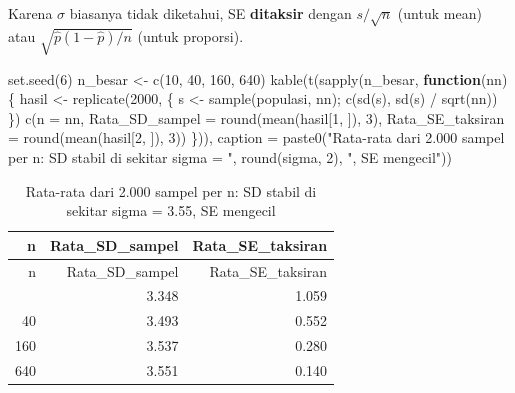 \documentclass[
  indonesian,
  letterpaper,
]{book}
\newenvironment{Shaded}{\begin{snugshade}}{\end{snugshade}}
\newcommand{\AttributeTok}[1]{\textcolor[rgb]{0.40,0.45,0.13}{#1}}
\newcommand{\ControlFlowTok}[1]{\textcolor[rgb]{0.00,0.23,0.31}{\textbf{#1}}}
\newcommand{\DecValTok}[1]{\textcolor[rgb]{0.68,0.00,0.00}{#1}}
\newcommand{\FunctionTok}[1]{\textcolor[rgb]{0.28,0.35,0.67}{#1}}
\newcommand{\NormalTok}[1]{\textcolor[rgb]{0.00,0.23,0.31}{#1}}
\newcommand{\OtherTok}[1]{\textcolor[rgb]{0.00,0.23,0.31}{#1}}
\newcommand{\SpecialCharTok}[1]{\textcolor[rgb]{0.37,0.37,0.37}{#1}}
\newcommand{\StringTok}[1]{\textcolor[rgb]{0.13,0.47,0.30}{#1}}
\begin{document}
Karena \(\sigma\) biasanya tidak diketahui, SE \textbf{ditaksir} dengan
\(s/\sqrt{n}\) (untuk mean) atau \(\sqrt{\hat{p}(1-\hat{p})/n}\) (untuk
proporsi).

\begin{Shaded}
\begin{Highlighting}[]
\FunctionTok{set.seed}\NormalTok{(}\DecValTok{6}\NormalTok{)}
\NormalTok{n\_besar }\OtherTok{\textless{}{-}} \FunctionTok{c}\NormalTok{(}\DecValTok{10}\NormalTok{, }\DecValTok{40}\NormalTok{, }\DecValTok{160}\NormalTok{, }\DecValTok{640}\NormalTok{)}
\FunctionTok{kable}\NormalTok{(}\FunctionTok{t}\NormalTok{(}\FunctionTok{sapply}\NormalTok{(n\_besar, }\ControlFlowTok{function}\NormalTok{(nn) \{}
\NormalTok{  hasil }\OtherTok{\textless{}{-}} \FunctionTok{replicate}\NormalTok{(}\DecValTok{2000}\NormalTok{, \{ s }\OtherTok{\textless{}{-}} \FunctionTok{sample}\NormalTok{(populasi, nn); }\FunctionTok{c}\NormalTok{(}\FunctionTok{sd}\NormalTok{(s), }\FunctionTok{sd}\NormalTok{(s) }\SpecialCharTok{/} \FunctionTok{sqrt}\NormalTok{(nn)) \})}
  \FunctionTok{c}\NormalTok{(}\AttributeTok{n =}\NormalTok{ nn, }\AttributeTok{Rata\_SD\_sampel =} \FunctionTok{round}\NormalTok{(}\FunctionTok{mean}\NormalTok{(hasil[}\DecValTok{1}\NormalTok{, ]), }\DecValTok{3}\NormalTok{),}
    \AttributeTok{Rata\_SE\_taksiran =} \FunctionTok{round}\NormalTok{(}\FunctionTok{mean}\NormalTok{(hasil[}\DecValTok{2}\NormalTok{, ]), }\DecValTok{3}\NormalTok{))}
\NormalTok{\})), }\AttributeTok{caption =} \FunctionTok{paste0}\NormalTok{(}\StringTok{"Rata{-}rata dari 2.000 sampel per n: SD stabil di sekitar sigma = "}\NormalTok{,}
                      \FunctionTok{round}\NormalTok{(sigma, }\DecValTok{2}\NormalTok{), }\StringTok{", SE mengecil"}\NormalTok{))}
\end{Highlighting}
\end{Shaded}

\begin{longtable}[]{@{}rrr@{}}
\caption{Rata-rata dari 2.000 sampel per n: SD stabil di sekitar sigma =
3.55, SE mengecil}\tabularnewline
\toprule\noalign{}
n & Rata\_SD\_sampel & Rata\_SE\_taksiran \\
\midrule\noalign{}
\endfirsthead
\toprule\noalign{}
n & Rata\_SD\_sampel & Rata\_SE\_taksiran \\
\midrule\noalign{}
\endhead
\bottomrule\noalign{}
\endlastfoot
10 & 3.348 & 1.059 \\
40 & 3.493 & 0.552 \\
160 & 3.537 & 0.280 \\
640 & 3.551 & 0.140 \\
\end{longtable}
\end{document}
